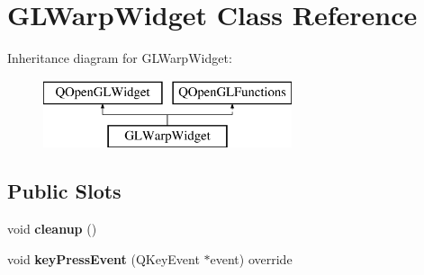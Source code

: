 \hypertarget{class_g_l_warp_widget}{}\section{G\+L\+Warp\+Widget Class Reference}
\label{class_g_l_warp_widget}
Inheritance diagram for G\+L\+Warp\+Widget\+:\begin{figure}[H]
\begin{center}
\leavevmode
\includegraphics[height=2.000000cm]{class_g_l_warp_widget}
\end{center}
\end{figure}
\subsection*{Public Slots}
\begin{DoxyCompactItemize}
\item 
\mbox{\label{class_g_l_warp_widget_a24e35ffcefc3499ec94c1e233d9f1b22}} 
void {\bfseries cleanup} ()
\item 
\mbox{\label{class_g_l_warp_widget_a5de5b6170929ad43973d9156c6c577d1}} 
void {\bfseries key\+Press\+Event} (Q\+Key\+Event $\ast$event) override
\end{DoxyCompactItemize}
